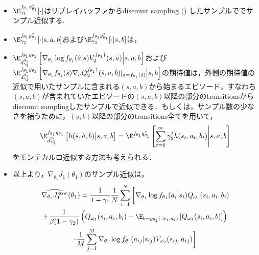 \documentclass[a4paper,10pt,dvipdfmx]{jsarticle}
\begin{document}
\begin{itemize}
\begin{itemize}
\begin{align}
            &\widehat{L}(\omega_1;\theta_1):=\dfrac{1}{N}\sum_{i=0}^N\left(r_1^{(i)}+\gamma_1Q_{\bar{\omega}_1}(s_i',a_i',b_i') - Q_{\omega_1}(s_i,a_i,b_i)\right)^2\Big|_{a_i'\sim f_{\bar{\theta}_1}(\cdot|s_i'),b_i'\sim g_{\bar{\theta}_2}(\cdot|s_i',a_i')},
        \end{align}
        where a minibatch of $N$ transitions $(s_i,a_i,b_i,r_1^{(i)},s_i')$ is sampled from replay buffer $\mathcal{D}$.
    \end{itemize}
    \item $\E_{\gamma_1}^{f_{\theta_1}g_{\theta_1}^*}[\cdot]$はリプレイバッファからdiscount sampling () したサンプルででサンプル近似する.
    \item $\E_{\gamma_2}^{f_{\theta_1}g_{\theta_1}^*}[\cdot|s,a,b]$および$\E_{\gamma_2}^{f_{\theta_1}g_{\theta_1}^*}[\cdot|s,b]$は，
    \item $\E_{d_{\gamma_2}^{\theta_1}}^{f_{\theta_1}g_{\theta_1}}\left[\nabla_{\theta_1}\log f_{\theta_1}(\dot{a}|\dot{s})V_2^{f_{\theta_1}\dag}(\dot{s},\dot{a})\middle|s,a,b\right]$および$\E_{d_{\gamma_2}^{\theta_1}}^{f_{\theta_1}g_{\theta_1}}\left[\nabla_{\theta_1}f_{\theta_1}(\dot{s})\nabla_{a}Q_2^{f_{\theta_1}\dag}(\dot{s},a,\dot{b})|_{a=f_{\theta_1}(\dot{s})}\middle|s,b\right]$の期待値は，外側の期待値の近似で用いたサンプルに含まれる$(s,a,b)$から始まるエピソード，すなわち$(s,a,b)$が含まれていたエピソードの$(s,a,b)$以降の部分のtransitionsからdiscount samplingしたサンプルで近似できる．もしくは，サンプル数の少なさを補うために，$(s,b)$以降の部分のtransitions全てを用いて，
    \begin{align}
        \E_{d_{\gamma_2}^{\theta_1}}^{f_{\theta_1}g_{\theta_1}}\left[h(\dot{s},\dot{a},\dot{b})\middle|s,a,b\right]=\E^{f_{\theta_1}g_{\theta_1}^*}\left[\sum_{t=0}^{\infty}\gamma_2^t h(s_t,a_t,b_t)\middle|s,a,b\right]
    \end{align}
    をモンテカルロ近似する方法も考えられる．
    \item 以上より，$\nabla_{\theta_1}J_1(\theta_1)$のサンプル近似は，
    \begin{multline}
        \widehat{\nabla_{\theta_1}J_1^{\mathrm{stoc}}}(\theta_1)=\dfrac{1}{1-\gamma_1}\dfrac{1}{N}\sum_{i=1}^N\bigg[\nabla_{\theta_1}\log f_{\theta_1}(a_i|s_i)Q_{\omega_1}(s_i,a_i,b_i)\\
        +\dfrac{1}{\beta(1-\gamma_2)}\left(Q_{\omega_1}(s_i,a_i,b_i)-\E_{b\sim g_{\theta_2}(\cdot|s_i,a_i)}\left[Q_{\omega_1}(s_i,a_i,b)\right]\right)\\
        \cdot\dfrac{1}{M}\sum_{j=1}^M\nabla_{\theta_1}\log f_{\theta_1}(a_{ij}|s_{ij})V_{\omega_2}(s_{ij},a_{ij})\bigg]\label{eq:SPG_qr_bbf_2_1_approx}

\end{multline}
\end{itemize}
\end{document}
